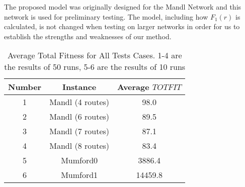 The proposed model was originally designed for the Mandl Network and this network is used for preliminary testing. The model, including how $F_1(r)$ is calculated, is not changed when testing on larger networks in order for us to establish the strengths and weaknesses of our method. 

\begin{table}[H]
    \centering
    \hspace*{-1.0cm}
    \begin{tabular}{|c|c|c|}
        \hline
        \textbf{Number} & \textbf{Instance} & \textbf{Average $TOTFIT$}\\
        \hline
        1 & Mandl (4 routes) & 98.0\\
        \hline
        2 & Mandl (6 routes) & 89.5\\
        \hline
        3 & Mandl (7 routes) & 87.1\\
        \hline
        4 & Mandl (8 routes) & 83.4\\
        \hline
        5 & Mumford0 & 3886.4\\
        \hline
        6 & Mumford1 & 14459.8\\
        \hline
    \end{tabular}
    \caption{Average Total Fitness for All Tests Cases. 1-4 are the results of 50 runs, 5-6 are the results of 10 runs}
    \label{tabel:averageTotfitAllTestCases}
\end{table}
 












